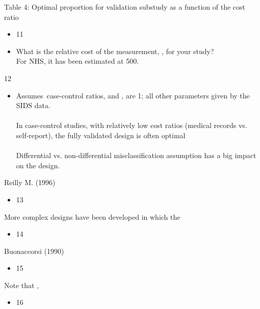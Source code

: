 \documentclass{beamer}
\begin{document}
\begin{frame}{Table 4: Optimal proportion          for validation substudy as a function of the cost ratio         }
\begin{itemize}
\item 11
\end{itemize}
\begin{itemize}
\item What is the relative cost of the measurement,    , for your study?   \\ For NHS, it has been estimated at 500.
\end{itemize}
\end{frame}
\begin{frame}{12}
\begin{itemize}
\item Assumes case-control ratios,         and        , are 1;  all other parameters given by the SIDS data. \\  \\ In case-control studies, with relatively low cost ratios (medical records vs. self-report), the fully validated design is often optimal \\  \\ Differential vs. non-differential misclassification assumption has a big impact on the design.
\end{itemize}
\end{frame}
\begin{frame}{Reilly M. (1996)}
\begin{itemize}
\item 13
\end{itemize}
\end{frame}
\begin{frame}{More complex designs have been developed in which the }
\begin{itemize}
\item 14
\end{itemize}
\end{frame}
\begin{frame}{Buonaccorsi (1990)}
\begin{itemize}
\item 15
\end{itemize}
\end{frame}
\begin{frame}{Note that                                                                                            ,}
\begin{itemize}
\item 16
\end{itemize}
\end{frame}
\end{document}
